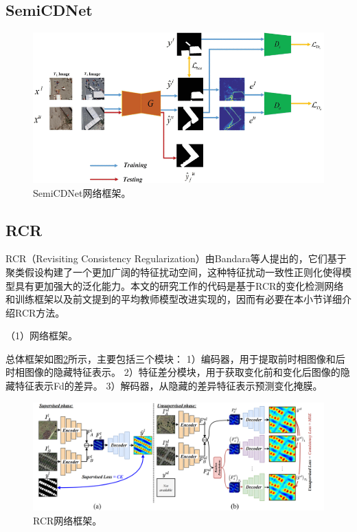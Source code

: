 \documentclass[lang=chs, degree=master, blindreview=false, adobe=false]{yanputhesis}
\begin{document}
\subsection{SemiCDNet}
\begin{figure}[htb]
  \centering
  \includegraphics[scale=0.45]{images/SemiCDNetframe.png}
  \caption{
    SemiCDNet网络框架\cite{peng2021SemiCDNet}。
  }
  \label{fig:SemiCDNetfram}
\end{figure}
\subsection{RCR}
RCR（Revisiting Consistency Regularization）由Bandara等人\cite{bandara2022RCR}提出的，它们基于聚类假设构建了一个更加广阔的特征扰动空间，这种特征扰动一致性正则化使得模型具有更加强大的泛化能力。本文的研究工作的代码是基于RCR的变化检测网络和训练框架以及前文提到的平均教师模型改进实现的，因而有必要在本小节详细介绍RCR方法。

（1）网络框架。

总体框架如图\ref{fig:RCRfram}所示，主要包括三个模块：
1）编码器，用于提取前时相图像和后时相图像的隐藏特征表示。
2）特征差分模块，用于获取变化前和变化后图像的隐藏特征表示Fd的差异。
3）解码器，从隐藏的差异特征表示预测变化掩膜。
\begin{figure}[htb]
  \centering
  \includegraphics[scale=0.45]{images/RCRframe.png}
  \caption{
    RCR网络框架\cite{bandara2022RCR}。
  }
  \label{fig:RCRfram}
\end{figure}
\end{document}
